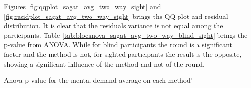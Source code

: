 %
%

Figures \ref{fig:qqplot_sagat_avg_two_way_sight} and \ref{fig:residplot_sagat_avg_two_way_sight} brings the QQ plot and residual distribution. It is clear that the residuals variance is not equal among the participants. Table \ref{tab:blocanova_sagat_avg_two_way_blind_sight} brings the p-value from ANOVA. While for blind participants the round is a significant factor and the method is not, for sighted participants the result is the opposite, showing a significant influence of the method and not of the round.

\begin{table}
    \caption{Anova p-value for the mental demand average on each method'}
    \label{tab:blocanova_sagat_avg_two_way_blind_sight}
\begin{minipage}{0.45\textwidth}
    
\end{minipage}
\begin{minipage}{0.45\textwidth}
        
\end{minipage}
\end{table}

